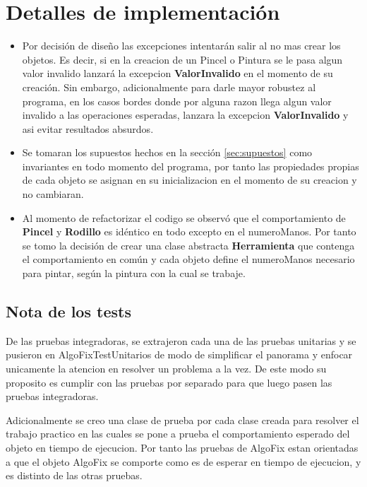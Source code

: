 \documentclass[titlepage,a4paper]{article}
\begin{document}
\section{Detalles de implementación}\label{sec:implementacion}
\begin{itemize}
  \item Por decisión de diseño las excepciones intentarán salir al no mas crear los objetos. Es decir, si en la creacion de un Pincel o Pintura se
  le pasa algun valor invalido lanzará la excepcion \textbf{ValorInvalido} en el momento de su creación. Sin embargo, adicionalmente para darle mayor 
  robustez al programa, en los casos bordes donde por alguna razon llega algun valor invalido a las operaciones esperadas, lanzara la 
  excepcion \textbf{ValorInvalido} y asi evitar resultados absurdos.
  
  \item Se tomaran los supuestos hechos en la sección \ref{sec:supuestos} como invariantes en todo momento del programa,
  por tanto las propiedades propias de cada objeto se asignan en su inicializacion en el momento de su creacion y no cambiaran.

  \item Al momento de refactorizar el codigo se observó que el comportamiento de \textbf{Pincel} y \textbf{Rodillo} es idéntico en todo excepto en el numeroManos. 
  Por tanto se tomo la decisión de crear una clase abstracta \textbf{Herramienta} que contenga el comportamiento en común y cada objeto define el numeroManos 
  necesario para pintar, según la pintura con la cual se trabaje.
\end{itemize}


\subsection{Nota de los tests}
De las pruebas integradoras, se extrajeron cada una de las pruebas unitarias y se pusieron en AlgoFixTestUnitarios 
de modo de simplificar el panorama y enfocar unicamente la atencion en resolver un problema a la vez. 
De este modo su proposito es cumplir con las pruebas por separado para que luego pasen las pruebas integradoras. \newline

Adicionalmente se creo una clase de prueba por cada clase creada para resolver el trabajo practico
en las cuales se pone a prueba el comportamiento esperado del objeto en tiempo de ejecucion. Por tanto
las pruebas de AlgoFix estan orientadas a que el objeto AlgoFix se comporte como es de esperar en tiempo de ejecucion, 
y es distinto de las otras pruebas.
\end{document}
